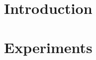 \documentclass[11pt]{article}
\begin{document}
\section{Introduction}
\label{sec: Introduction}

\section{Experiments}
\label{sec: Experiments}






\printbibliography
\end{document}
